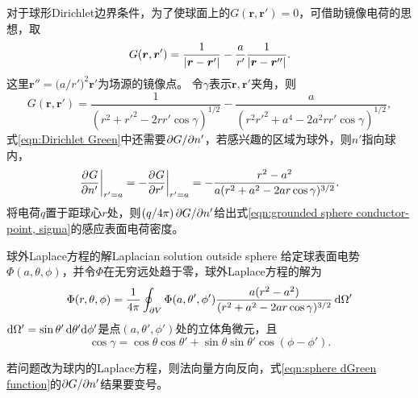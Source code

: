 对于球形Dirichlet边界条件，为了使球面上的$G(\bm r,\bm r') = 0$，可借助镜像电荷的思想，取
\begin{equation}
    \label{eqn:sphere Green function}
    G(\bm r,\bm r') = \frac1{\lvert\bm r - \bm r'\rvert} - \frac a{r'}\frac1{\lvert\bm r - \bm r''\rvert}.
\end{equation}
这里$\bm r'' = \bigl(a/r'\bigr)^2\bm r'$为场源的镜像点。
令$\gamma$表示$\bm r,\bm r'$夹角，则
\[
    G(\bm r,\bm r') = \frac1{(r^2 + r'^2 - 2rr'\cos\gamma)^{1/2}} - \frac a{(r^2r'^2 + a^4 - 2a^2rr'\cos\gamma)^{1/2}},
\]
式\eqref{eqn:Dirichlet Green}中还需要$\partial G/\partial n'$，若感兴趣的区域为球外，则$n'$指向球内，
\begin{equation}
    \label{eqn:sphere dGreen function}
    {\frac{\partial^{}G}{\partial{n'}^{}}}\biggr\rvert_{r'=a} = -{\frac{\partial^{}G}{\partial{r'}^{}}}\biggr\rvert_{r'=a} = -\frac{r^2 - a^2}{a(r^2 + a^2 - 2ar\cos\gamma)^{3/2}}.
\end{equation}
将电荷$q$置于距球心$r$处，则$(q/4\pi)\,\partial G/\partial n'$给出式\eqref{eqn:grounded sphere conductor-point, sigma}的感应表面电荷密度。

\begin{theorem}
    {球外Laplace方程的解}{Laplacian solution outside sphere}
    给定球表面电势$\Phi(a,\theta,\phi)$，并令$\Phi$在无穷远处趋于零，球外Laplace方程的解为
    \begin{equation}
        \label{eqn:sphere Laplace solution}
        \Phi(r,\theta,\phi) = \frac1{4\pi}\oint_{\partial V}\Phi(a,\theta',\phi')\frac{a(r^2 - a^2)}{(r^2 + a^2 - 2ar\cos\gamma)^{3/2}}\mathop{}\!\mathrm{d}\Omega'
    \end{equation}
    $\mathop{}\!\mathrm{d}\Omega' = \sin\theta'\mathop{}\!\mathrm{d}\theta'\mathrm{d}\phi'$是点$(a,\theta',\phi')$处的立体角微元，且
    \begin{equation}
        \label{eq:ed-angular-separation}
        \cos\gamma = \cos\theta\cos\theta' + \sin\theta\sin\theta'\cos(\phi - \phi').
    \end{equation}
\end{theorem}
\begin{remark}
    若问题改为球内的Laplace方程，则法向量方向反向，式\eqref{eqn:sphere dGreen function}的$\partial G/\partial n'$结果要变号。
\end{remark}

